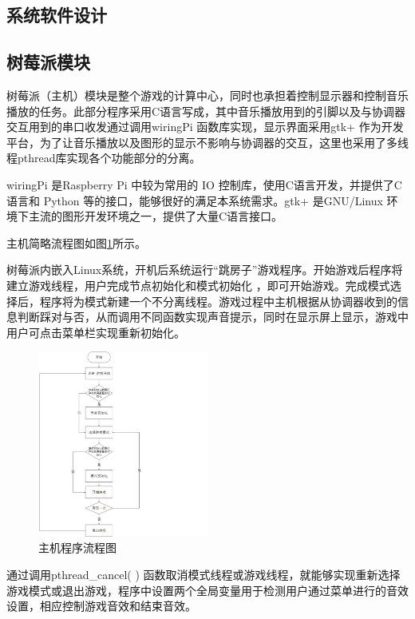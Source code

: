 \begin{spacing}{1.2}
\section{系统软件设计}

\subsection{树莓派模块}
    树莓派（主机）模块是整个游戏的计算中心，同时也承担着控制显示器和控制音乐播放的任务。此部分程序采用C语言写成，其中音乐播放用到的引脚以及与协调器交互用到的串口收发通过调用wiringPi 函数库实现，显示界面采用gtk+ 作为开发平台，为了让音乐播放以及图形的显示不影响与协调器的交互，这里也采用了多线程pthread库实现各个功能部分的分离。

    wiringPi 是Raspberry Pi 中较为常用的 IO 控制库，使用C语言开发，并提供了C语言和 Python 等的接口，能够很好的满足本系统需求。gtk+ 是GNU/Linux 环境下主流的图形开发环境之一，提供了大量C语言接口。

    主机简略流程图如图\ref{fig:liucheng}所示。

    树莓派内嵌入Linux系统，开机后系统运行“跳房子”游戏程序。开始游戏后程序将建立游戏线程，用户完成节点初始化和模式初始化 ，即可开始游戏。完成模式选择后，程序将为模式新建一个不分离线程。游戏过程中主机根据从协调器收到的信息判断踩对与否，从而调用不同函数实现声音提示，同时在显示屏上显示，游戏中用户可点击菜单栏实现重新初始化。
 
\begin{figure}[htb]
    \centering
    {\includegraphics [width=0.5\textwidth]{./image/流程图.png}
    \caption{主机程序流程图}
    \label{fig:liucheng}}
\end{figure}

    通过调用pthread\_cancel( ) 函数取消模式线程或游戏线程，就能够实现重新选择游戏模式或退出游戏，程序中设置两个全局变量用于检测用户通过菜单进行的音效设置，相应控制游戏音效和结束音效。


\end{spacing}
